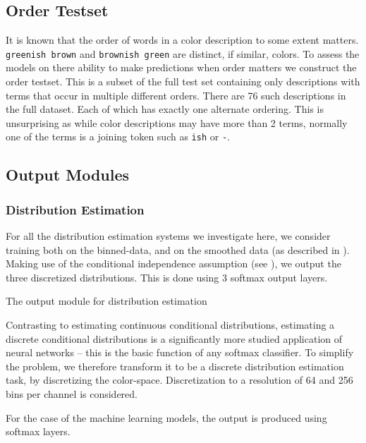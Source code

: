 \documentclass[11pt,a4paper]{article}
\newcommand{\natlang}[1]{\texttt{#1}}
\begin{document}
\subsection{Order Testset}
It is known that the order of words in a color description to some extent matters.
\natlang{greenish brown} and \natlang{brownish green} are distinct, if similar, colors.
To assess the models on there ability to make predictions when order matters we construct the order testset.
This is a subset of the full test set containing only descriptions with terms that occur in multiple different orders.
There are 76 such descriptions in the full dataset.
Each of which has exactly one alternate ordering.
This is unsurprising as while color descriptions may have more than 2 terms, normally one of the terms is a joining token such as \natlang{ish} or \natlang{-}.



\subsection{Output Modules}
\subsubsection{Distribution Estimation}

For all the distribution estimation systems we investigate here, 
we consider training both on the binned-data, and on the smoothed data (as described in ).
Making use of the conditional independence assumption (see ), we output the three discretized distributions.
This is done using 3 softmax output layers.

The output module for distribution estimation 

Contrasting to estimating continuous conditional distributions, 
estimating a discrete conditional distributions is a significantly more studied application of neural networks
-- this is the basic function of any softmax classifier.
To simplify the problem, we therefore transform it to be a discrete distribution estimation task, by discretizing the color-space.
Discretization to a resolution of 64 and 256 bins per channel is considered.


For the case of the machine learning models, the output is produced using softmax layers.
\end{document}
